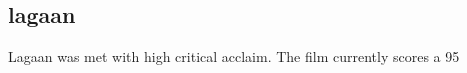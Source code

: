 \documentclass[a4paper]{article}
\begin{document}
\subsection{lagaan}	            
	Lagaan was met with high critical acclaim. The film currently scores a 95%
	     
	    
	

	
	
\end{document}
